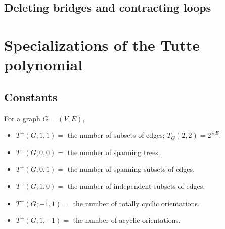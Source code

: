 \documentclass{amsart}
\theoremstyle{definition}
\begin{document}

\subsection{Deleting bridges and contracting loops}


\section{Specializations of the Tutte polynomial}

\subsection{Constants}
For a graph $G = (V,E)$,
\begin{itemize}
\item 
$T^+(G;1,1)=$  the number of subsets of edges;
$T_G(2,2) = 2^{\# E}$.

\item 
$T^+(G;0,0) =$ the number of spanning trees.

\item 
$T^+(G;0,1) =$ the number of spanning subsets of edges.

\item 
$T^+(G;1,0) =$ the number of independent subsets of edges.

\item 
$T^+(G;-1,1) =$ the number of totally cyclic orientations.

\item 
$T^+(G;1,-1) =$ the number of acyclic orientations.
\end{itemize}
\end{document}
